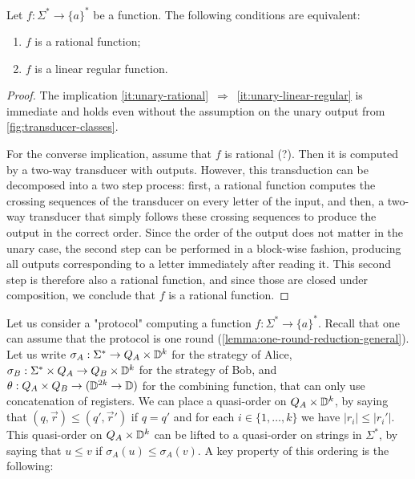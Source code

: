 \begin{lemma}
  \label{lem:unary-linear-regular-rational}
  Let $f : \Sigma^* \to \{a\}^*$ be a function. The following conditions are
  equivalent:
  \begin{enumerate}
    \item \label{it:unary-rational}
      $f$ is a rational function;
    \item \label{it:unary-linear-regular}
        $f$ is a linear regular function.
  \end{enumerate}
\end{lemma}
\begin{proof}
  The implication \ref{it:unary-rational}~$\Rightarrow$~\ref{it:unary-linear-regular}
  is immediate  and holds even without the assumption on the 
  unary output from \cref{fig:transducer-classes}.

  For the converse implication, assume that $f$ is rational (?).
  Then it is
  computed by a two-way transducer with outputs. However, this transduction can
  be decomposed into a two step process: first, a rational function computes
  the crossing sequences of the transducer on every letter of the input, and
  then, a two-way transducer that simply follows these crossing sequences to
  produce the output in the correct order. Since the order of the output does
  not matter in the unary case, the second step can be performed in a
  block-wise fashion, producing all outputs corresponding to a letter
  immediately after reading it. This second step is therefore also a rational
  function, and since those are closed under composition, we conclude that $f$ is
  a rational function.
\end{proof}

Let us consider a "protocol" computing a function $f : \Sigma^* \to \{a\}^*$.
Recall that one can assume that the protocol is one round
(\cref{lemma:one-round-reduction-general}). Let us write $\sigma_A : \Sigma^*
\to Q_A \times \mathbb D^k$ for the strategy of Alice, $\sigma_B : \Sigma^*
\times Q_A \to Q_B \times \mathbb D^k$ for the strategy of Bob, and $\theta : Q_A
\times Q_B \to (\mathbb D^{2k} \to \mathbb D)$ for the combining function, that can
only use concatenation of registers. We can place a quasi-order on $Q_A \times
\mathbb D^k$, by saying that $(q, \vec{r}) \leq (q', \vec{r}')$ if $q = q'$ and
for each $i \in \{1, \ldots, k\}$ we have $|r_i|\leq |r_i'|$. This quasi-order
on $Q_A \times \mathbb D^k$ can be lifted to a quasi-order on strings in
$\Sigma^*$, by saying that $u \leq v$ if $\sigma_A(u) \leq \sigma_A(v)$. A key
property of this ordering is the following:

